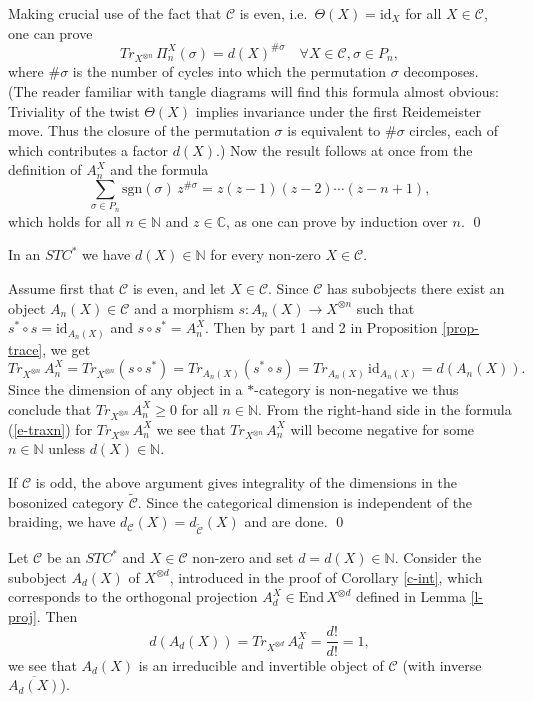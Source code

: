 \documentclass[11pt]{article}
\theoremstyle{definition}
\theoremstyle{definition}
\theoremstyle{remark}
\def\2#1{{\mathcal #1}}
\def\7#1{{\mathbb #1}}
\newcommand{\End}{\mathrm{End}}
\newcommand{\mcirc}{\circ}
\newcommand{\rarr}{\rightarrow}
\def\id{\mathrm{id}}
\begin{document}
 Making crucial use of the fact that $\2C$ is even,
i.e.\ $\Theta(X)=\id_X$ for all $X\in\2C$, one can prove
\[   Tr_{X^{\otimes n}}\,\Pi_n^X(\sigma)= d(X)^{\#\sigma} \quad\forall X\in\2C, \sigma\in P_n, \]
where $\#\sigma$ is the number of cycles into which the permutation $\sigma$ decomposes. (The reader
familiar with tangle diagrams will find this formula almost obvious: Triviality of the twist
$\Theta(X)$ implies invariance under the first Reidemeister move. Thus the closure of the
permutation $\sigma$ is equivalent to $\#\sigma$ circles, each of which contributes a factor $d(X)$.)
Now the result follows at once from the definition of $A_n^X$ and the formula
\[  \sum_{\sigma\in P_n} \mathrm{sgn}(\sigma)\,z^{\#\sigma}=z(z-1)(z-2)\cdots (z-n+1), \]
which holds for all $n\in\7N$ and $z\in\7C$, as one can prove by induction over $n$.
\qed

\bcoro \label{c-int} 
In an $STC^*$ we have $d(X)\in\7N$ for every non-zero $X\in\2C$.
\ecoro 

\prf Assume first that $\2C$ is even, and let $X\in\2C$. Since $\2C$ has subobjects there exist an
object $A_n(X)\in\2C$ and a morphism $s: A_n(X)\rarr X^{\otimes n}$ such that 
$s^*\mcirc  s=\id_{A_n(X)}$ and $s\mcirc  s^*=A^X_n$. Then by part 1 and 2 in Proposition
\ref{prop-trace}, we get 
\[ Tr_{X^{\otimes n}}\,A_n^X = Tr_{X^{\otimes n}}(s\mcirc s^*) =
Tr_{A_n(X)}(s^*\mcirc s) =Tr_{A_n(X)}\,\id_{A_n(X)} = d({A_n(X)}). \]
Since the dimension of any object in a $*$-category is non-negative we
thus conclude that $Tr_{X^{\otimes n}}\,A_n^X\ge 0$ for all $n\in\7N$.
From the right-hand side in the formula (\ref{e-traxn}) for
$Tr_{X^{\otimes n}}\,A_n^X$ we see that $Tr_{X^{\otimes n}}\,A_n^X$
will become negative for some $n\in\7N$ unless $d(X)\in\7N$.

If $\2C$ is odd, the above argument gives integrality of the dimensions in the bosonized category
$\widetilde{\2C}$. Since the categorical dimension is independent of the braiding, we have
$d_\2C(X)=d_{\widetilde{\2C}}(X)$ and are done.
\qed


Let $\2C$ be an $STC^*$ and $X\in\2C$ non-zero and set $d=d(X)\in\7N$. Consider the subobject 
$A_d(X)$ of $X^{\otimes d}$, introduced in the proof of Corollary \ref{c-int}, which corresponds to
the orthogonal projection $A_d^X\in\End\,X^{\otimes d}$ defined in Lemma \ref{l-proj}. Then
\[ d(A_d (X))=Tr_{X^{\otimes d}}\,A_d^X=\frac{d!}{d!}=1 ,\]
we see that $A_d (X)$ is an irreducible and invertible object of $\2C$ (with inverse $\overline{A_d (X)}$).
\end{document}

